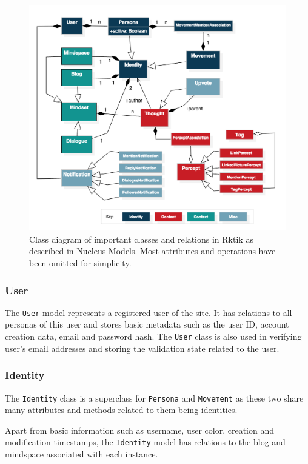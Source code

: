 \begin{figure}[htbp]
\centering
\includegraphics{img/terminology.png}
\caption{Class diagram of important classes and relations in Rktik as
described in \hyperref[nucleus-models]{Nucleus Models}. Most attributes
and operations have been omitted for simplicity.}
\end{figure}

\subsubsection{User}\label{user}

The \texttt{User} model represents a registered user of the site. It has
relations to all personas of this user and stores basic metadata such as
the user ID, account creation data, email and password hash. The
\texttt{User} class is also used in verifying user's email addresses and
storing the validation state related to the user.

\subsubsection{Identity}\label{identity-1}

The \texttt{Identity} class is a superclass for \texttt{Persona} and
\texttt{Movement} as these two share many attributes and methods related
to them being identities.

Apart from basic information such as username, user color, creation and
modification timestamps, the \texttt{Identity} model has relations to
the blog and mindspace associated with each instance.

